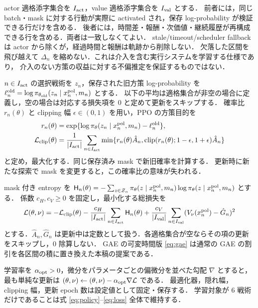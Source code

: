 actor 適格添字集合を $I_{\rm act}$，value 適格添字集合を $I_{\rm val}$ とする．
前者には，同じ batch・mask に対する行動が実際に activated され，保存 log-probability が検証できる行だけを含める．
後者には，時間差・報酬・次価値・継続履歴が再構成できる行を含める．両者は一致しなくてよい．
stale/timeout/scheduler fallback は actor から除くが，経過時間と報酬は軌跡から削除しない．
欠落した区間を飛び越えて $\Delta_n$ を縮めない．これは介入を含む実行システムを学習する仕様であり，
介入のない方策の収益に対する不偏推定を保証するものではない．

$n\in I_{\rm act}$ の選択戦術を $z_n$，保存された旧方策 log-probability を
$\ell_n^{\rm old}=\log\pi_{\theta_{\rm old}}(z_n\mid x_n^{\rm pol},m_n)$ とする．
以下の平均は適格集合が非空の場合に定義し，空の場合は対応する損失項を $0$ と定めて更新をスキップする．
確率比 $r_n(\theta)$ と clipping 幅 $\epsilon\in(0,1)$ を用い，PPO の方策目的を
\begin{align}
 r_n(\theta)&=\exp\{\log\pi_\theta(z_n\mid x_n^{\rm pol},m_n)-\ell_n^{\rm old}\},\label{eq:ratio}\\
 \mathcal L_{\rm clip}(\theta)&=\frac1{|I_{\rm act}|}\sum_{n\in I_{\rm act}}
 \min\{r_n(\theta)\hat A_n,
       \operatorname{clip}(r_n(\theta);1-\epsilon,1+\epsilon)\hat A_n\}
 \label{eq:ppo}
\end{align}
と定め，最大化する\cite{ppo}．同じ保存済み mask で新旧確率を計算する．
更新時に新たな探索で mask を変更すると，この確率比の意味が失われる．

mask 付き entropy を
$\mathsf H_n(\theta)=-\sum_{z\in\mathcal Z_n}\pi_\theta(z\mid x_n^{\rm pol},m_n)
\log\pi_\theta(z\mid x_n^{\rm pol},m_n)$ とする．
係数 $c_H,c_V\ge0$ を固定し，最小化する総損失を
\begin{equation}\label{eq:loss}
 \mathcal L(\theta,\nu)=
 -\mathcal L_{\rm clip}(\theta)
 -\frac{c_H}{|I_{\rm act}|}\sum_{n\in I_{\rm act}}\mathsf H_n(\theta)
 +\frac{c_V}{|I_{\rm val}|}\sum_{n\in I_{\rm val}}
       (V_\nu(x_n^{\rm pol})-\hat G_n)^2
\end{equation}
とする．$\hat A_n,\hat G_n$ は更新中は定数として扱う．各適格集合が空ならその項の更新をスキップし，$0$ 除算しない．
GAE の可変時間版 \eqref{eq:gae} は通常の GAE\cite{gae} の割引を各区間の積に置き換えた本稿の提案である．

学習率を $\alpha_{\rm opt}>0$，微分をパラメータごとの偏微分を並べた勾配 $\nabla$ とすると，
最も単純な更新は $(\theta,\nu)\leftarrow(\theta,\nu)-\alpha_{\rm opt}\nabla\mathcal L$ である．
最適化器，隠れ幅，clipping 幅，更新 epoch 数は設定値として固定・保存する．
学習対象が $6$ 戦術だけであることは式 \eqref{eq:policy}--\eqref{eq:loss} 全体で維持する．

